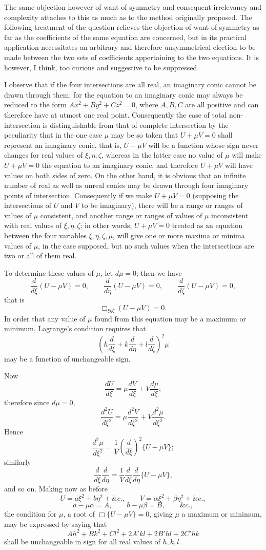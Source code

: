 \documentclass[11pt]{article}
\newcommand{\sourcepage}[1]{\marginpar{\scriptsize p.~#1}}
\begin{document}
{{\sourcepage{122}
The same objection however of want of symmetry and consequent irrelevancy and complexity attaches to this as much as to the method originally proposed. The following treatment of the question relieves the objection of want of symmetry as far as the coefficients of the same equation are concerned, but in its practical application necessitates an arbitrary and therefore unsymmetrical election to be made between the two sets of coefficients appertaining to the two equations. It is however, I think, too curious and suggestive to be suppressed.

I observe that if the four intersections are all real, an imaginary conic cannot be drawn through them; for the equation to an imaginary conic may always be reduced to the form $Ax^2+By^2+Cz^2=0$, where $A,B,C$ are all positive and can therefore have at utmost one real point. Consequently the case of total non-intersection is distinguishable from that of complete intersection by the peculiarity that in the one case $\mu$ may be so taken that $U+\mu V=0$ shall represent an imaginary conic, that is, $U+\mu V$ will be a function whose sign never changes for real values of $\xi,\eta,\zeta$, whereas in the latter case no value of $\mu$ will make $U+\mu V=0$ the equation to an imaginary conic, and therefore $U+\mu V$ will have values on both sides of zero. On the other hand, it is obvious that an infinite number of real as well as unreal conics may be drawn through four imaginary points of intersection. Consequently if we make $U+\mu V=0$ (supposing the intersections of $U$ and $V$ to be imaginary), there will be a range or ranges of values of $\mu$ consistent, and another range or ranges of values of $\mu$ inconsistent with real values of $\xi,\eta,\zeta$; in other words, $U+\mu V=0$ treated as an equation between the four variables $\xi,\eta,\zeta,\mu$, will give one or more maxima or minima values of $\mu$, in the case supposed, but no such values when the intersections are two or all of them real.

To determine these values of $\mu$, let $d\mu=0$; then we have
\[
\frac{d}{d\xi}(U-\mu V)=0,\qquad
\frac{d}{d\eta}(U-\mu V)=0,\qquad
\frac{d}{d\zeta}(U-\mu V)=0,
\]
that is
\[
\Box_{\xi\eta\zeta}(U-\mu V)=0.
\]
In order that any value of $\mu$ found from this equation may be a maximum or minimum, Lagrange's condition requires that
\[
\left(h\frac{d}{d\xi}+k\frac{d}{d\eta}+l\frac{d}{d\zeta}\right)^2\mu
\]
may be a function of unchangeable sign.

\sourcepage{123}
Now
\[
\frac{dU}{d\xi}=\mu\frac{dV}{d\xi}+V\frac{d\mu}{d\xi};
\]
therefore since $d\mu=0$,
\[
\frac{d^2U}{d\xi^2}=\mu\frac{d^2V}{d\xi^2}+V\frac{d^2\mu}{d\xi^2}.
\]
Hence
\[
\frac{d^2\mu}{d\xi^2}=\frac{1}{V}\left(\frac{d}{d\xi}\right)^2\{U-\mu V\};
\]
similarly
\[
\frac{d}{d\xi}\frac{d}{d\eta}
=\frac{1}{V}\frac{d}{d\xi}\frac{d}{d\eta}\{U-\mu V\},
\]
and so on. Making now as before
\[
U=a\xi^2+b\eta^2+\&c.,\qquad
V=\alpha\xi^2+\beta\eta^2+\&c.,
\]
\[
a-\mu\alpha=A,\qquad b-\mu\beta=B,\qquad \&c.,
\]
the condition for $\mu$, a root of $\Box\{U-\mu V\}=0$, giving $\mu$ a maximum or minimum, may be expressed by saying that
\[
Ah^2+Bk^2+Cl^2+2A'kl+2B'hl+2C'hk
\]
shall be unchangeable in sign for all real values of $h,k,l$.

}}
\end{document}
